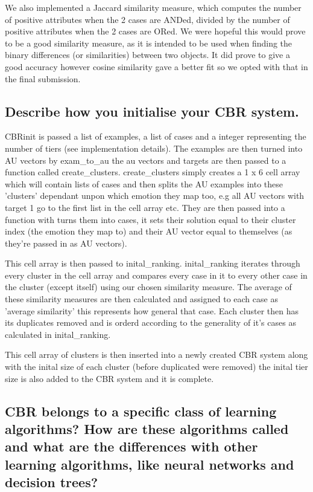 \documentclass[11pt]{article}
\begin{document}
We also implemented a Jaccard similarity measure, which computes the number of positive attributes
when the 2 cases are ANDed, divided by the number of positive attributes when the 2 cases are ORed.
We were hopeful this would prove to be a good similarity measure, as it is intended to be
used when finding the binary differences (or similarities) between two objects. It did prove
to give a good accuracy however cosine similarity gave a better fit so we opted with that in
the final submission.


\subsection{Describe how you initialise your CBR system.}
CBRinit is passed a list of examples, a list of cases and a integer representing the number of tiers (see implementation details). The examples are then turned into AU vectors by exam\_to\_au the au vectors and targets are then passed to a function called create\_clusters. create\_clusters simply creates a 1 x 6 cell array which will contain lists of cases and then splits the AU examples into these 'clusters' dependant unpon which emotion they map too, e.g all AU vectors with target 1 go to the first list in the cell array etc. They are then passed into a function with turns them into cases, it sets their solution equal to their cluster index (the emotion they map to) and their AU vector equal to themselves (as they're passed in as AU vectors).

This cell array is then passed to inital\_ranking. inital\_ranking iterates through every cluster in the cell array and compares every case in it to every other case in the cluster (except itself) using our chosen similarity measure. The average of these similarity measures are then calculated and assigned to each case as 'average similarity' this represents how general that case. Each cluster then has its duplicates removed and is orderd according to the generality of it's cases as calculated in inital\_ranking. 

This cell array of clusters is then inserted into a newly created CBR system along with the inital size of each cluster (before duplicated were removed) the inital tier size is also added to the CBR system and it is complete.

\subsection{CBR belongs to a specific class of learning algorithms? How are these algorithms called and what are the differences with other learning algorithms, like neural networks and decision trees?}
\end{document}
